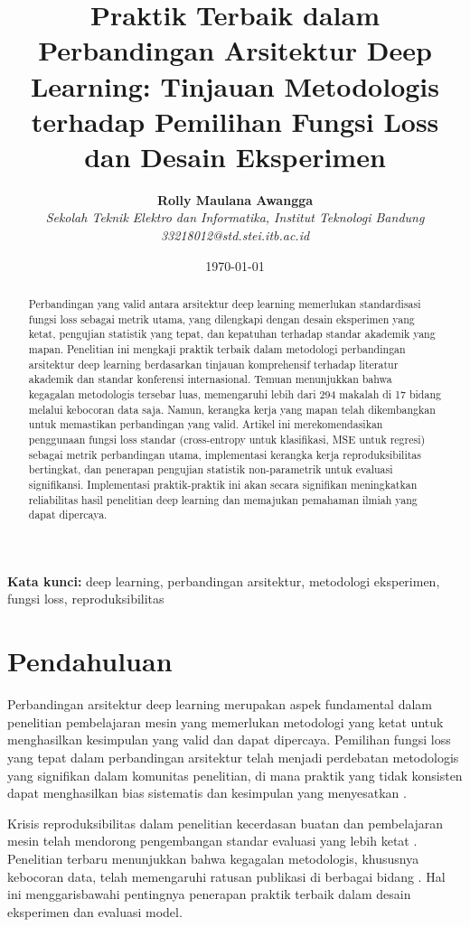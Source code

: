 \documentclass[12pt,a4paper]{article}
\title{\textbf{Praktik Terbaik dalam Perbandingan Arsitektur Deep Learning: Tinjauan Metodologis terhadap Pemilihan Fungsi Loss dan Desain Eksperimen}}
\author{
\textbf{Rolly Maulana Awangga}\\
\textit{Sekolah Teknik Elektro dan Informatika, Institut Teknologi Bandung}\\
\textit{33218012@std.stei.itb.ac.id}
}
\date{\today}
\begin{document}
\maketitle

\begin{abstract}
Perbandingan yang valid antara arsitektur deep learning memerlukan standardisasi fungsi loss sebagai metrik utama, yang dilengkapi dengan desain eksperimen yang ketat, pengujian statistik yang tepat, dan kepatuhan terhadap standar akademik yang mapan. Penelitian ini mengkaji praktik terbaik dalam metodologi perbandingan arsitektur deep learning berdasarkan tinjauan komprehensif terhadap literatur akademik dan standar konferensi internasional. Temuan menunjukkan bahwa kegagalan metodologis tersebar luas, memengaruhi lebih dari 294 makalah di 17 bidang melalui kebocoran data saja. Namun, kerangka kerja yang mapan telah dikembangkan untuk memastikan perbandingan yang valid. Artikel ini merekomendasikan penggunaan fungsi loss standar (cross-entropy untuk klasifikasi, MSE untuk regresi) sebagai metrik perbandingan utama, implementasi kerangka kerja reproduksibilitas bertingkat, dan penerapan pengujian statistik non-parametrik untuk evaluasi signifikansi. Implementasi praktik-praktik ini akan secara signifikan meningkatkan reliabilitas hasil penelitian deep learning dan memajukan pemahaman ilmiah yang dapat dipercaya.
\end{abstract}

\textbf{Kata kunci:} deep learning, perbandingan arsitektur, metodologi eksperimen, fungsi loss, reproduksibilitas

\section{Pendahuluan}

Perbandingan arsitektur deep learning merupakan aspek fundamental dalam penelitian pembelajaran mesin yang memerlukan metodologi yang ketat untuk menghasilkan kesimpulan yang valid dan dapat dipercaya. Pemilihan fungsi loss yang tepat dalam perbandingan arsitektur telah menjadi perdebatan metodologis yang signifikan dalam komunitas penelitian, di mana praktik yang tidak konsisten dapat menghasilkan bias sistematis dan kesimpulan yang menyesatkan \citep{kapoor2022leakage}.

Krisis reproduksibilitas dalam penelitian kecerdasan buatan dan pembelajaran mesin telah mendorong pengembangan standar evaluasi yang lebih ketat \citep{desai2025reproducibility}. Penelitian terbaru menunjukkan bahwa kegagalan metodologis, khususnya kebocoran data, telah memengaruhi ratusan publikasi di berbagai bidang \citep{kapoor2022leakage}. Hal ini menggarisbawahi pentingnya penerapan praktik terbaik dalam desain eksperimen dan evaluasi model.
\end{document}
